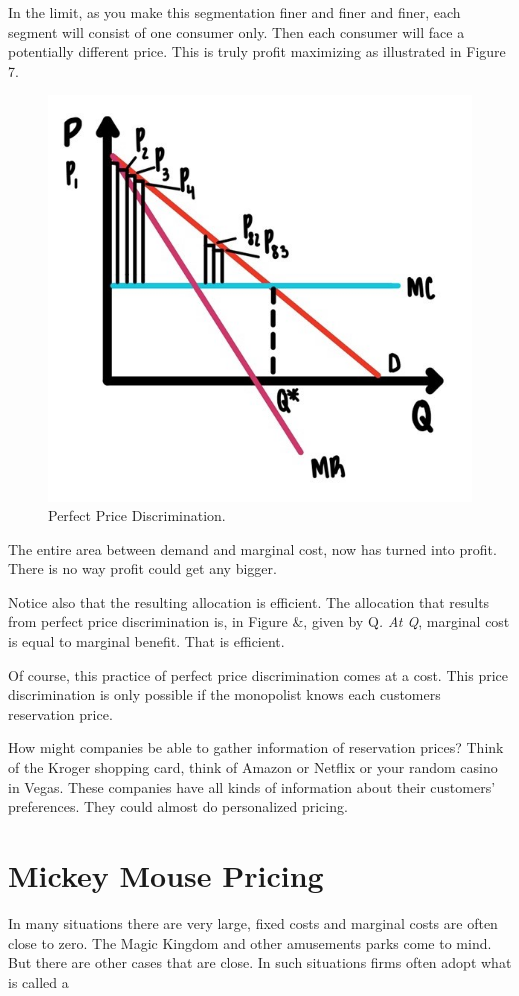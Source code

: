 \documentclass[
]{book}
\begin{document}
In the limit, as you make this segmentation finer and finer and finer, each segment will consist of one consumer only. Then each consumer will face a potentially different price. This is truly profit maximizing as illustrated in Figure 7.

\begin{figure}

{\centering \includegraphics[width=0.5\linewidth]{img/ch6/fig8} 

}

\caption{Perfect Price Discrimination.}\label{fig:fig608}
\end{figure}

The entire area between demand and marginal cost, now has turned into profit. There is no way profit could get any bigger.

Notice also that the resulting allocation is efficient. The allocation that results from perfect price discrimination is, in Figure \&, given by Q\emph{. At Q}, marginal cost is equal to marginal benefit. That is efficient.

Of course, this practice of perfect price discrimination comes at a cost. This price discrimination is only possible if the monopolist knows each customers reservation price.

How might companies be able to gather information of reservation prices? Think of the Kroger shopping card, think of Amazon or Netflix or your random casino in Vegas. These companies have all kinds of information about their customers' preferences. They could almost do personalized pricing.

\hypertarget{mickey-mouse-pricing}{%
\section{Mickey Mouse Pricing}\label{mickey-mouse-pricing}}

In many situations there are very large, fixed costs and marginal costs are often close to zero. The Magic Kingdom and other amusements parks come to mind. But there are other cases that are close. In such situations firms often adopt what is called a
\end{document}
